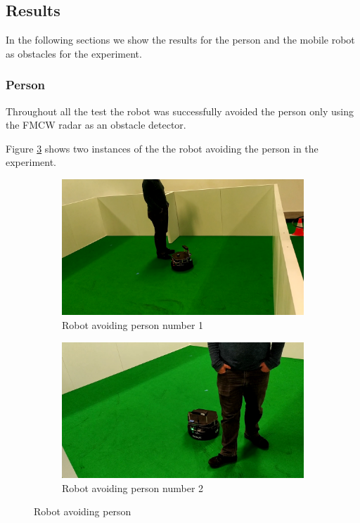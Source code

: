 \subsection{Results}
In the following sections we show the results for the person and the mobile robot as obstacles for the experiment.
\subsubsection{Person}
Throughout all the test the robot was successfully avoided the person  only using the \ac{FMCW} \ac{radar} as an obstacle detector. 
 
Figure \ref{fig:exp3person} shows two instances of the the robot avoiding the person in the experiment.
\begin{figure}[ht!]
  \centering
  \begin{subfigure}[b]{0.49\linewidth}
    \includegraphics[width=\linewidth]{imgs/chapter5/exp3person1.png}
     \caption{Robot avoiding person number 1}
     \label{fig::exp3person1}
  \end{subfigure}
  \begin{subfigure}[b]{0.49\linewidth}
    \includegraphics[width=\linewidth]{imgs/chapter5/exp3person2.png}
    \caption{Robot avoiding person  number 2}
    \label{fig::exp3person2}
  \end{subfigure}
  \caption{Robot avoiding person }
  \label{fig:exp3person}
\end{figure}


